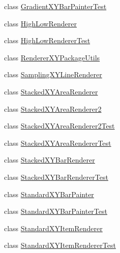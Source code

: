 \begin{DoxyCompactItemize}
\item 
class \mbox{\hyperlink{classorg_1_1jfree_1_1chart_1_1renderer_1_1xy_1_1_gradient_x_y_bar_painter_test}{Gradient\+X\+Y\+Bar\+Painter\+Test}}
\item 
class \mbox{\hyperlink{classorg_1_1jfree_1_1chart_1_1renderer_1_1xy_1_1_high_low_renderer}{High\+Low\+Renderer}}
\item 
class \mbox{\hyperlink{classorg_1_1jfree_1_1chart_1_1renderer_1_1xy_1_1_high_low_renderer_test}{High\+Low\+Renderer\+Test}}
\item 
class \mbox{\hyperlink{classorg_1_1jfree_1_1chart_1_1renderer_1_1xy_1_1_renderer_x_y_package_utils}{Renderer\+X\+Y\+Package\+Utils}}
\item 
class \mbox{\hyperlink{classorg_1_1jfree_1_1chart_1_1renderer_1_1xy_1_1_sampling_x_y_line_renderer}{Sampling\+X\+Y\+Line\+Renderer}}
\item 
class \mbox{\hyperlink{classorg_1_1jfree_1_1chart_1_1renderer_1_1xy_1_1_stacked_x_y_area_renderer}{Stacked\+X\+Y\+Area\+Renderer}}
\item 
class \mbox{\hyperlink{classorg_1_1jfree_1_1chart_1_1renderer_1_1xy_1_1_stacked_x_y_area_renderer2}{Stacked\+X\+Y\+Area\+Renderer2}}
\item 
class \mbox{\hyperlink{classorg_1_1jfree_1_1chart_1_1renderer_1_1xy_1_1_stacked_x_y_area_renderer2_test}{Stacked\+X\+Y\+Area\+Renderer2\+Test}}
\item 
class \mbox{\hyperlink{classorg_1_1jfree_1_1chart_1_1renderer_1_1xy_1_1_stacked_x_y_area_renderer_test}{Stacked\+X\+Y\+Area\+Renderer\+Test}}
\item 
class \mbox{\hyperlink{classorg_1_1jfree_1_1chart_1_1renderer_1_1xy_1_1_stacked_x_y_bar_renderer}{Stacked\+X\+Y\+Bar\+Renderer}}
\item 
class \mbox{\hyperlink{classorg_1_1jfree_1_1chart_1_1renderer_1_1xy_1_1_stacked_x_y_bar_renderer_test}{Stacked\+X\+Y\+Bar\+Renderer\+Test}}
\item 
class \mbox{\hyperlink{classorg_1_1jfree_1_1chart_1_1renderer_1_1xy_1_1_standard_x_y_bar_painter}{Standard\+X\+Y\+Bar\+Painter}}
\item 
class \mbox{\hyperlink{classorg_1_1jfree_1_1chart_1_1renderer_1_1xy_1_1_standard_x_y_bar_painter_test}{Standard\+X\+Y\+Bar\+Painter\+Test}}
\item 
class \mbox{\hyperlink{classorg_1_1jfree_1_1chart_1_1renderer_1_1xy_1_1_standard_x_y_item_renderer}{Standard\+X\+Y\+Item\+Renderer}}
\item 
class \mbox{\hyperlink{classorg_1_1jfree_1_1chart_1_1renderer_1_1xy_1_1_standard_x_y_item_renderer_test}{Standard\+X\+Y\+Item\+Renderer\+Test}}

\end{DoxyCompactItemize}
